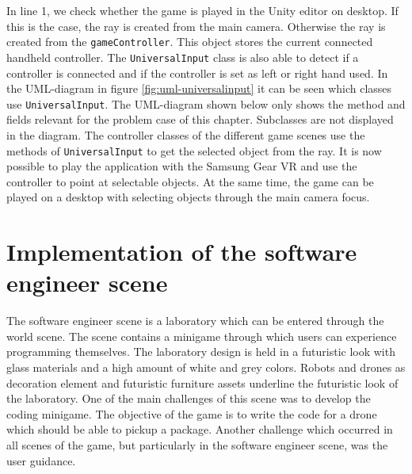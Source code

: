 In line 1, we check whether the game is played in the Unity editor on desktop. If this is the case, the ray is created from the main camera. Otherwise the ray is created from the \texttt{gameController}. This object stores the current connected handheld controller.
The \texttt{UniversalInput} class is also able to detect if a controller is connected and if the controller is set as left or right hand used. In the UML-diagram in figure \ref{fig:uml-universalinput} it can be seen which classes use \texttt{UniversalInput}. The UML-diagram shown below only shows the method and fields relevant for the problem case of this chapter. Subclasses are not displayed in the diagram. The controller classes of the different game scenes use the methods of \texttt{UniversalInput} to get the selected object from the ray. It is now possible to play the application with the Samsung Gear VR and use the controller to point at selectable objects. At the same time, the game can be played on a desktop with selecting objects through the main camera focus.

\section{Implementation of the software engineer scene}
The software engineer scene is a laboratory which can be entered through the world scene. The scene contains a minigame through which users can experience programming themselves. The laboratory design is held in a futuristic look with glass materials and a high amount of white and grey colors. Robots and drones as decoration element and futuristic furniture assets underline the futuristic look of the laboratory. One of the main challenges of this scene was to develop the coding minigame. The objective of the game is to write the code for a drone which should be able to pickup a package. Another challenge which occurred in all scenes of the game, but particularly in the software engineer scene, was the user guidance.
